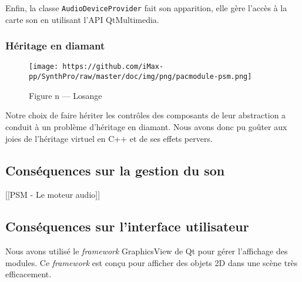 Enfin, la classe \verb!AudioDeviceProvider! fait son apparition,
elle gère l'accès à la carte son en utilisant l'API QtMultimedia.

\subsubsection{Héritage en diamant}

\begin{figure}[htb]
\centering
\texttt{[image: https://github.com/iMax-pp/SynthPro/raw/master/doc/img/png/pacmodule-psm.png]}
\caption{Figure n — Losange}
\end{figure}

Notre choix de faire hériter les contrôles des composants de leur
abstraction a conduit à un problème d'héritage en diamant. Nous
avons donc pu goûter aux joies de l'héritage virtuel en C++ et de
ses effets pervers.

\subsection{Conséquences sur la gestion du son}

[[PSM - Le moteur audio]]

\subsection{Conséquences sur l'interface utilisateur}

Nous avons utilisé le \emph{framework} GraphicsView de Qt pour
gérer l'affichage des modules. Ce \emph{framework} est conçu pour
afficher des objets 2D dans une scène très efficacement.

